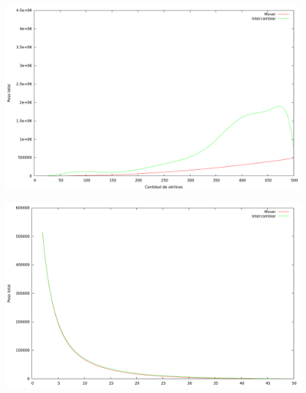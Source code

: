 \vspace*{0.5cm}

\begin{figure}[H]
  \begin{center}
    \includegraphics[scale=0.35]{imagenes/local-random-n-peso.png}
  \end{center}
\end{figure}

\vspace*{0.5cm}

\begin{figure}[H]
  \begin{center}
    \includegraphics[scale=0.35]{imagenes/local-goloso-k-peso.png}
  \end{center}
\end{figure}

\vspace*{0.5cm}

